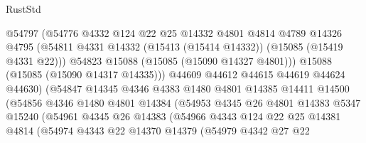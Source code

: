 \begin{lexlean}{RustStd}
\begin{coremodule}
                            @54797
                            (@54776
                              @4332
                              @124
                              @22
                              @25
                              @14332
                              @4801
                              @4814
                              @4789
                              @14326
                              @4795
                              (@54811
                                @4331
                                @14332
                                (@15413 (@15414 @14332))
                                (@15085 (@15419 @4331 @22)))
                              @54823
                              @15088
                              (@15085 (@15090 @14327 @4801)))
                            @15088
                            (@15085 (@15090 @14317 @14335)))
                          @44609
                          @44612
                          @44615
                          @44619
                          @44624
                          @44630)
                        (@54847
                          @14345
                          @4346
                          @4383
                          @1480
                          @4801
                          @14385
                          @14411
                          @14500
                          (@54856
                            @4346
                            @1480
                            @4801
                            @14384
                            (@54953
                              @4345
                              @26
                              @4801
                              @14383
                              @5347
                              @15240
                              (@54961
                                @4345
                                @26
                                @14383
                                (@54966
                                  @4343
                                  @124
                                  @22
                                  @25
                                  @14381
                                  @4814
                                  (@54974
                                    @4343
                                    @22
                                    @14370
                                    @14379
                                    (@54979
                                      @4342
                                      @27
                                      @22

\end{coremodule}
\end{lexlean}
